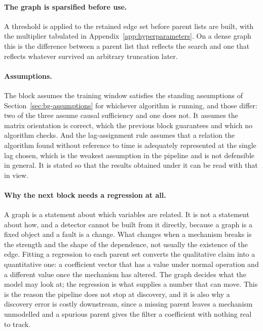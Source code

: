 \paragraph{The graph is sparsified before use.} A threshold is applied to the retained edge set before parent lists are built, with the multiplier tabulated in Appendix~\ref{app:hyperparameters}. On a dense graph this is the difference between a parent list that reflects the search and one that reflects whatever survived an arbitrary truncation later.

\paragraph{Assumptions.} The block assumes the training window satisfies the standing assumptions of Section~\ref{sec:bg-assumptions} for whichever algorithm is running, and those differ: two of the three assume causal sufficiency and one does not. It assumes the matrix orientation is correct, which the previous block guarantees and which no algorithm checks. And the lag-assignment rule assumes that a relation the algorithm found without reference to time is adequately represented at the single lag chosen, which is the weakest assumption in the pipeline and is not defensible in general. It is stated so that the results obtained under it can be read with that in view.

\paragraph{Why the next block needs a regression at all.} A graph is a statement about which variables are related. It is not a statement about how, and a detector cannot be built from it directly, because a graph is a fixed object and a fault is a change. What changes when a mechanism breaks is the strength and the shape of the dependence, not usually the existence of the edge. Fitting a regression to each parent set converts the qualitative claim into a quantitative one: a coefficient vector that has a value under normal operation and a different value once the mechanism has altered. The graph decides what the model may look at; the regression is what supplies a number that can move. This is the reason the pipeline does not stop at discovery, and it is also why a discovery error is costly downstream, since a missing parent leaves a mechanism unmodelled and a spurious parent gives the filter a coefficient with nothing real to track.

